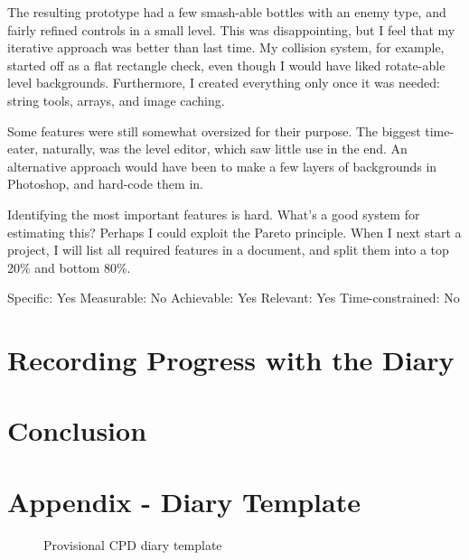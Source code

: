 \documentclass{scrartcl}
\begin{document}
The resulting prototype had a few smash-able bottles with an enemy type, and fairly refined controls in a small level. This was disappointing, but I feel that my iterative approach was better than last time. My collision system, for example, started off as a flat rectangle check, even though I would have liked rotate-able level backgrounds. Furthermore, I created everything only once it was needed: string tools, arrays, and image caching.

Some features were still somewhat oversized for their purpose. The biggest time-eater, naturally, was the level editor, which saw little use in the end. An alternative approach would have been to make a few layers of backgrounds in Photoshop, and hard-code them in.

Identifying the most important features is hard. What's a good system for estimating this? Perhaps I could exploit the Pareto principle. When I next start a project, I will list all required features in a document, and split them into a top 20\% and bottom 80\%.

Specific: Yes
Measurable: No
Achievable: Yes
Relevant: Yes
Time-constrained: No

\section{Recording Progress with the Diary} %


\section{Conclusion} %





\newpage
\section{Appendix - Diary Template}
\begin{figure}[h]
\centering
\caption{Provisional CPD diary template}
\end{figure}
\end{document}
